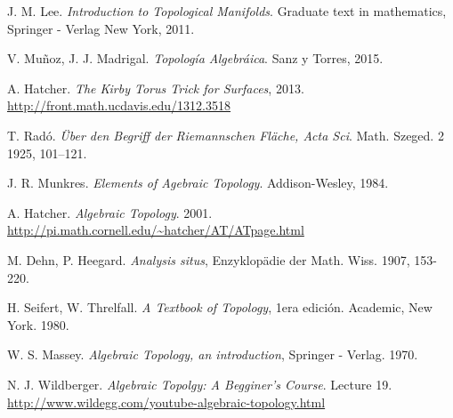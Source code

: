 \documentclass[10pt]{report}
\theoremstyle{definition}
\begin{document}
\begin{thebibliography}{99}

J. M. Lee.
\textit{Introduction to Topological Manifolds}. Graduate text in mathematics, Springer - Verlag New York, 2011.

V. Muñoz, J. J. Madrigal. 
\textit{Topología Algebráica}. Sanz y Torres, 2015.


A. Hatcher.
\textit{The Kirby Torus Trick for Surfaces}, 2013.
\\\url{http://front.math.ucdavis.edu/1312.3518}


T. Radó.
\textit{Über den Begriff der Riemannschen Fläche, Acta Sci}. Math. Szeged. 2 1925,
101–121.

J. R. Munkres.
\textit{Elements of Agebraic Topology}. Addison-Wesley, 1984.

A. Hatcher.
\textit{Algebraic Topology}. 2001. 
\\\url{http://pi.math.cornell.edu/~hatcher/AT/ATpage.html}

M. Dehn, P. Heegard.
\textit{Analysis situs}, Enzyklopädie der Math. Wiss. 1907, 153-220.


H. Seifert, W. Threlfall.
\textit{A Textbook of Topology}, 1era edición. Academic, New York. 1980.

W. S. Massey. 
\textit{Algebraic Topology, an introduction}, Springer - Verlag. 1970.

N. J. Wildberger.
\textit{Algebraic Topolgy: A Begginer's Course}. Lecture 19.
\\\url{http://www.wildegg.com/youtube-algebraic-topology.html}

\end{thebibliography}
\end{document}
